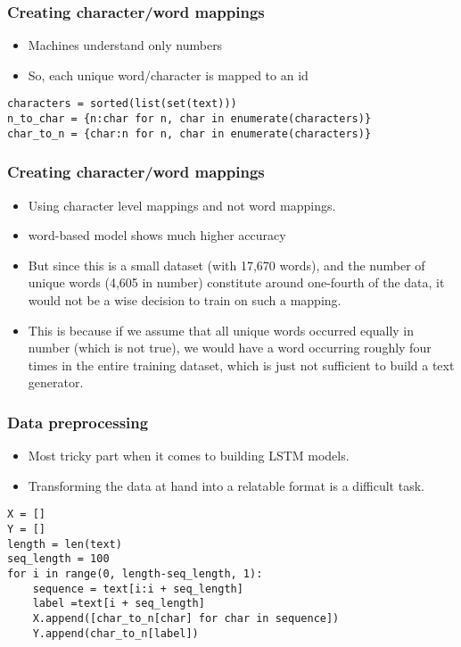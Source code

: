 \begin{frame}[fragile]
  \frametitle{Creating character/word mappings}
  \begin{itemize}
  \item Machines understand only numbers
  \item So, each unique word/character is mapped to an id
  	  \end{itemize}
\begin{lstlisting}
characters = sorted(list(set(text)))
n_to_char = {n:char for n, char in enumerate(characters)}
char_to_n = {char:n for n, char in enumerate(characters)}
\end{lstlisting}
 \end{frame} 
  
\begin{frame}[fragile]
  \frametitle{Creating character/word mappings}

  \begin{itemize}
  \item Using character level mappings and not word mappings. 
  \item word-based model shows much higher accuracy 
  \item But since this is a small dataset (with 17,670 words), and the number of unique words (4,605 in number) constitute around one-fourth of the data, it would not be a wise decision to train on such a mapping.
  \item This is because if we assume that all unique words occurred equally in number (which is not true), we would have a word occurring roughly four times in the entire training dataset, which is just not sufficient to build a text generator.
  	  \end{itemize}
 \end{frame} 
 
\begin{frame}[fragile]
  \frametitle{Data preprocessing}
  \begin{itemize}
  \item Most tricky part when it comes to building LSTM models. 
\item Transforming the data at hand into a relatable format is a difficult task.
  	  \end{itemize}
\begin{lstlisting}
X = []
Y = []
length = len(text)
seq_length = 100
for i in range(0, length-seq_length, 1):
    sequence = text[i:i + seq_length]
    label =text[i + seq_length]
    X.append([char_to_n[char] for char in sequence])
    Y.append(char_to_n[label])
\end{lstlisting}
 \end{frame} 
 
